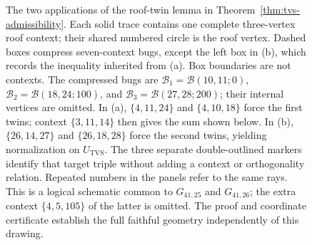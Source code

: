 \documentclass[aps,pra,reprint,superscriptaddress,longbibliography,nofootinbib,floatfix,10pt]{revtex4-2}
\theoremstyle{definition}\newtheorem{definition}[theorem]{Definition}
\theoremstyle{remark}\newtheorem{remark}[theorem]{Remark}
\begin{document}
\begin{figure}[!t]
{%
}
\caption{The two applications of the roof-twin lemma in Theorem~\ref{thm:tvs-admissibility}. Each solid trace contains one complete three-vertex roof context; their shared numbered circle is the roof vertex. Dashed boxes compress seven-context bugs, except the left box in (b), which records the inequality inherited from (a). Box boundaries are not contexts. The compressed bugs are $\mathcal B_1=\mathcal B(10,11;0)$, $\mathcal B_2=\mathcal B(18,24;100)$, and $\mathcal B_3=\mathcal B(27,28;200)$; their internal vertices are omitted. In (a), $\{4,11,24\}$ and $\{4,10,18\}$ force the first twins; context $\{3,11,14\}$ then gives the sum shown below. In (b), $\{26,14,27\}$ and $\{26,18,28\}$ force the second twins, yielding normalization on $U_{\mathrm{TVS}}$. The three separate double-outlined markers identify that target triple without adding a context or orthogonality relation. Repeated numbers in the panels refer to the same rays. This is a logical schematic common to $G_{41,25}$ and $G_{41,26}$; the extra context $\{4,5,105\}$ of the latter is omitted. The proof and coordinate certificate establish the full faithful geometry independently of this drawing.}\label{fig:TVS-admissibility}
\end{figure}
\end{document}
